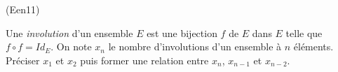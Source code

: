 \begin{tiny}(Een11)\end{tiny} Une \emph{involution} d'un ensemble $E$ est une bijection $f$ de $E$ dans $E$ telle que $f\circ f=Id_E$. On note $x_n$ le nombre d'involutions d'un ensemble à $n$ éléments. Préciser $x_1$ et $x_2$ puis former une relation entre $x_n$, $x_{n-1}$ et $x_{n-2}$. 